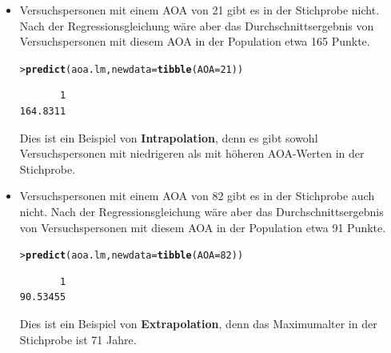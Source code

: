 \documentclass[oneside, 10pt]{book}\usepackage[]{graphicx}\usepackage[]{xcolor}
\makeatletter
\newcommand{\hlnum}[1]{\textcolor[rgb]{0.686,0.059,0.569}{#1}}%
\newcommand{\hlstd}[1]{\textcolor[rgb]{0.345,0.345,0.345}{#1}}%
\newcommand{\hlkwc}[1]{\textcolor[rgb]{0.333,0.667,0.333}{#1}}%
\newcommand{\hlkwd}[1]{\textcolor[rgb]{0.737,0.353,0.396}{\textbf{#1}}}%
\newenvironment{kframe}{%
 \def\at@end@of@kframe{}%
 \ifinner\ifhmode%
  \def\at@end@of@kframe{\end{minipage}}%
  \begin{minipage}{\columnwidth}%
 \fi\fi%
 \def\FrameCommand##1{\hskip\@totalleftmargin \hskip-\fboxsep
 \colorbox{shadecolor}{##1}\hskip-\fboxsep
     \hskip-\linewidth \hskip-\@totalleftmargin \hskip\columnwidth}%
 \MakeFramed {\advance\hsize-\width
   \@totalleftmargin\z@ \linewidth\hsize
   \@setminipage}}%
 {\par\unskip\endMakeFramed%
 \at@end@of@kframe}
\newenvironment{knitrout}{}{} %
\makeatother
\begin{document}
\begin{itemize}
 \item Versuchspersonen mit einem AOA von 21 gibt es in der Stichprobe
 nicht. Nach der Regressionsgleichung wäre aber das Durchschnittsergebnis
 von Versuchspersonen mit diesem AOA in der Population etwa 165 Punkte.
\begin{knitrout}
\color{fgcolor}\begin{kframe}
\begin{alltt}
\hlstd{> }\hlkwd{predict}\hlstd{(aoa.lm,} \hlkwc{newdata} \hlstd{=} \hlkwd{tibble}\hlstd{(}\hlkwc{AOA} \hlstd{=} \hlnum{21}\hlstd{))}
\end{alltt}
\begin{verbatim}
       1 
164.8311 
\end{verbatim}
\end{kframe}
\end{knitrout}

  Dies ist ein Beispiel von \textbf{Intrapolation}, denn
  es gibt sowohl Versuchspersonen mit niedrigeren als mit höheren AOA-Werten
  in der Stichprobe.

 \item Versuchspersonen mit einem AOA von 82 gibt es in der Stichprobe auch
 nicht. Nach der Regressionsgleichung wäre aber das Durchschnittsergebnis
 von Versuchspersonen mit diesem AOA in der Population etwa 91 Punkte.
\begin{knitrout}
\color{fgcolor}\begin{kframe}
\begin{alltt}
\hlstd{> }\hlkwd{predict}\hlstd{(aoa.lm,} \hlkwc{newdata} \hlstd{=} \hlkwd{tibble}\hlstd{(}\hlkwc{AOA} \hlstd{=} \hlnum{82}\hlstd{))}
\end{alltt}
\begin{verbatim}
       1 
90.53455 
\end{verbatim}
\end{kframe}
\end{knitrout}

  Dies ist ein Beispiel von \textbf{Extrapolation}, denn
  das Maximumalter in der Stichprobe ist 71 Jahre.


\end{itemize}
\end{document}
